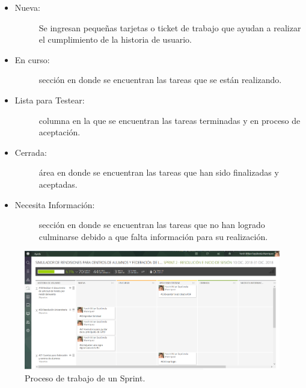 \begin{itemize}
    \item   \begin{description}
                \item[Nueva:] Se ingresan pequeñas tarjetas o ticket de trabajo que ayudan a realizar el cumplimiento de la historia de usuario.
            \end{description}

    \item   \begin{description}
                \item[En curso:] sección en donde se encuentran las tareas que se están realizando.
            \end{description}

    \item   \begin{description}
                \item[Lista para Testear:] columna en la que se encuentran las tareas terminadas y en proceso de aceptación.
            \end{description}

    \item   \begin{description}
                \item[Cerrada:] área en donde se encuentran las tareas que han sido finalizadas y aceptadas.
            \end{description}
    
    \item   \begin{description}
                \item[Necesita Información:] sección en donde se encuentran las tareas que no han logrado culminarse debido a que falta información para su realización.
            \end{description}
\end{itemize}

\begin{figure}[h!]
    \includegraphics[width=\textwidth]{Imagenes/Kanban.png}
    \caption{\label{fig: kanbanSprint} Proceso de trabajo de un Sprint.}
\end{figure}

